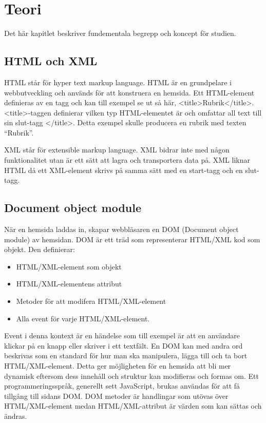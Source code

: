 \section{Teori}
\label{sec:axel-theory}
Det här kapitlet beskriver fundementala begrepp och koncept för studien.

\subsection{HTML och XML}
HTML står för hyper text markup language. HTML är en grundpelare i webbutveckling och används för att konstruera en hemsida.\cite{w3-html} Ett HTML-element definieras av en tagg och kan till exempel se ut så här, <title>Rubrik</title>. <title>-taggen definierar vilken typ HTML-elementet är och omfattar all text till sin slut-tagg </title>. Detta exempel skulle producera en rubrik med texten ``Rubrik''. 

XML står för extensible markup language. XML bidrar inte med någon funktionalitet utan är ett sätt att lagra och transportera data på. XML liknar HTML då ett XML-element skrivs på samma sätt med en start-tagg och en slut-tagg.

\subsection{Document object module}
När en hemsida laddas in, skapar webbläsaren en DOM (Document object module) av hemsidan. DOM är ett träd som representerar HTML/XML kod som objekt. \cite{w3-htmldom} Den definierar:

\begin{itemize}
\item HTML/XML-element som objekt
\item HTML/XML-elementens attribut
\item Metoder för att modifera HTML/XML-element
\item Alla event för varje HTML/XML-element.
\end{itemize} 

Event i denna kontext är en händelse som till exempel är att en användare klickar på en knapp eller skriver i ett textfält. En DOM kan med andra ord beskrivas som en standard för hur man ska manipulera, lägga till och ta bort HTML/XML-element. Detta ger möjligheten för en hemsida att bli mer dynamisk eftersom dess innehåll och struktur kan modifieras och formas om. Ett programmeringsspråk, generellt sett JavaScript, brukas användas för att få tillgång till sidans DOM. DOM metoder är handlingar som utövas över HTML/XML-element medan HTML/XML-attribut är värden som kan sättas och ändras.

